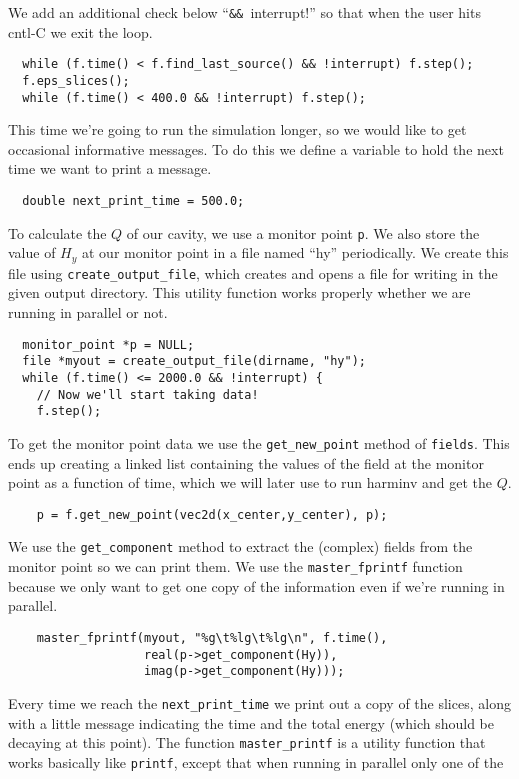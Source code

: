 We add an additional check below ``\verb!&& !interrupt!'' so that when the
user hits cntl-C we exit the loop.
\begin{verbatim}
  while (f.time() < f.find_last_source() && !interrupt) f.step();
  f.eps_slices();
  while (f.time() < 400.0 && !interrupt) f.step();
\end{verbatim}
This time we're going to run the simulation longer, so we would like to get
occasional informative messages.  To do this we define a variable to hold
the next time we want to print a message.
\begin{verbatim}
  double next_print_time = 500.0;
\end{verbatim}
To calculate the $Q$ of our cavity, we use a monitor point \verb!p!.  We
also store the value of $H_y$ at our monitor point in a file named ``hy''
periodically.  We create this file using \verb!create_output_file!, which
creates and opens a file for writing in the given output directory.  This
utility function works properly whether we are running in parallel or not.
\begin{verbatim}
  monitor_point *p = NULL;
  file *myout = create_output_file(dirname, "hy");
  while (f.time() <= 2000.0 && !interrupt) {
    // Now we'll start taking data!
    f.step();
\end{verbatim}
To get the monitor point data we use the \verb!get_new_point! method of
\verb!fields!.  This ends up creating a linked list containing the values
of the field at the monitor point as a function of time, which we will
later use to run harminv and get the $Q$.
\begin{verbatim}
    p = f.get_new_point(vec2d(x_center,y_center), p);
\end{verbatim}
We use the \verb!get_component! method to extract the (complex) fields from
the monitor point so we can print them.  We use the \verb!master_fprintf!
function because we only want to get one copy of the information even if
we're running in parallel.
\begin{verbatim}
    master_fprintf(myout, "%g\t%lg\t%lg\n", f.time(),
                   real(p->get_component(Hy)),
                   imag(p->get_component(Hy)));
\end{verbatim}
Every time we reach the \verb!next_print_time! we print out a copy of the
slices, along with a little message indicating the time and the total
energy (which should be decaying at this point).  The function
\verb!master_printf! is a utility function that works basically like
\verb!printf!, except that when running in parallel only one of the
